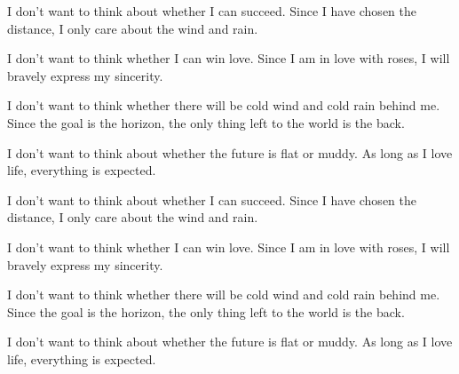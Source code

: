 
\enabstract

I don't want to think about whether I can succeed. Since I have chosen the distance, I only care about the wind and rain.



I don't want to think whether I can win love. Since I am in love with roses, I will bravely express my sincerity.



I don't want to think whether there will be cold wind and cold rain behind me. Since the goal is the horizon, the only thing left to the world is the back.



I don't want to think about whether the future is flat or muddy. As long as I love life, everything is expected.



I don't want to think about whether I can succeed. Since I have chosen the distance, I only care about the wind and rain.



I don't want to think whether I can win love. Since I am in love with roses, I will bravely express my sincerity.



I don't want to think whether there will be cold wind and cold rain behind me. Since the goal is the horizon, the only thing left to the world is the back.



I don't want to think about whether the future is flat or muddy. As long as I love life, everything is expected.


	

